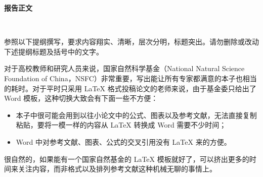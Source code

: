 \documentclass[a4paper,zihao=-4]{article}
\newcommand{\kaishu}{}
\newcommand{\zihao}[1]{\fontsize{12pt}{0}}
\begin{document}
\ifxetex
\kaishu
\else
\begin{CJK*}{UTF8}{gbsn}
\fi

\setlength{\abovedisplayskip}{0pt}
\setlength{\belowdisplayskip}{0pt}

\begin{center}
{\kaishu \zihao{2} \textbf{报告正文} \vspace{-3ex}}
\end{center}  

\thispagestyle{empty} 　　　%

{\kaishu \zihao{4}参照以下提纲撰写，要求内容翔实、清晰，层次分明，标题突出。}\alert{请勿删除或改动下述提纲标题及括号中的文字。\vspace{9bp}}



对于高校教师和研究人员来说，国家自然科学基金（National Natural Science Foundation of China，NSFC）非常重要，写出能让所有专家都满意的本子也相当的耗时。对于平时只采用 LaTeX 格式投稿论文的老师来说，由于基金委只给出了 Word 模板，这种切换大致会有下面一些不方便：
\begin{itemize}
	\item 本子中很可能会用到以往小论文中的公式、图表以及参考文献，无法直接复制粘贴，要将一模一样的内容从 LaTeX 转换成 Word 需要不少时间；
	\item Word 中对参考文献、图表、公式的交叉引用没有 LaTeX 来的方便。
\end{itemize}
很自然的，如果能有一个国家自然基金的 LaTeX 模板就好了，可以挤出更多的时间来关注内容，而非格式以及排列参考文献这种机械无聊的事情上。


\end{CJK*}
\end{document}
